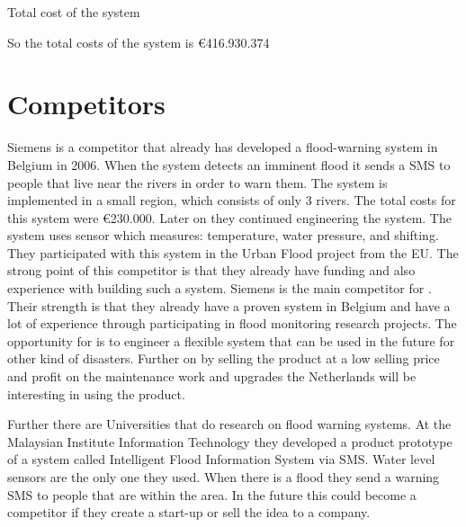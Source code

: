 \begin{table}[H]
	\caption{Total cost of the system}
	\label{table:totalcosts}
\end{table}
So the total costs of the system is \euro{}416.930.374\\

\section{Competitors}
Siemens is a competitor that already has developed a flood-warning system in Belgium in 2006. When the system detects an imminent flood it sends a SMS to people that live near the rivers in order to warn them. The system is implemented in a small region, which consists of only 3 rivers. The total costs for this system were \euro{}230.000. Later on they continued engineering the system. The system uses sensor which measures: temperature, water pressure, and shifting. They participated with this system in the Urban Flood project from the EU. The strong point of this competitor is that they already have funding and also experience with building such a system. Siemens is the main competitor for \CompanyName{}. Their strength is that they already have a proven system in Belgium and have a lot of experience through participating in flood monitoring research projects. The opportunity for \CompanyName{} is to engineer a flexible system that can be used in the future for other kind of disasters. Further on by selling the product at a low selling price and profit on the maintenance work and upgrades the Netherlands will be interesting in using the product.

Further there are Universities that do research on flood warning systems. At the Malaysian Institute Information Technology they developed a product prototype of a system called Intelligent Flood Information System via SMS. Water level sensors are the only one they used. When there is a flood they send a warning SMS to people that are within the area. In the future this could become a competitor if they create a start-up or sell the idea to a company.  

